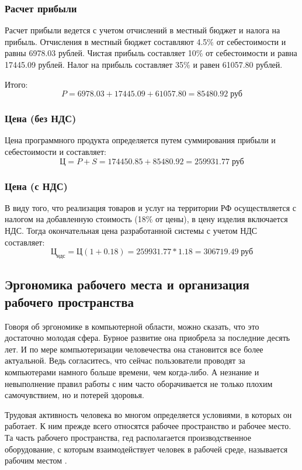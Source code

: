 \documentclass[russian,utf8,emptystyle]{eskdtext}
\begin{document}
\begin{spacing}{1.5}
\subsubsection{Расчет прибыли}
Расчет прибыли ведется с учетом отчислений в местный бюджет и налога на прибыль. Отчисления в местный бюджет составляют 4.5\% от себестоимости и равны 6978.03 рублей. Чистая прибыль составляет 10\% от себестоимости и равна 17445.09 рублей. Налог на прибыль составляет 35\% и равен 61057.80 рублей.

Итого:
$$
P = 6978.03 + 17445.09 + 61057.80 = 85480.92 \; \text{руб}
$$

\subsubsection{Цена (без НДС)}
Цена программного продукта определяется путем суммирования прибыли и себестоимости и составляет: 
$$
\text{Ц} = P + S = 174450.85 + 85480.92 = 259931.77  \; \text{руб}
$$

\subsubsection{Цена (с НДС)}
В виду того, что реализация товаров и услуг на территории РФ осуществляется с налогом на добавленную стоимость (18\% от цены), в цену изделия включается НДС. Тогда окончательная цена разработанной системы с учетом НДС составляет:
$$
\text{Ц}_\text{ндс} = \text{Ц}(1 + 0.18) = 259931.77*1.18 = 306719.49 \; \text{руб}
$$

\subsection{Эргономика рабочего места и организация рабочего пространства}
Говоря об эргономике в компьютерной области, можно сказать, что это достаточно молодая сфера. Бурное развитие она приобрела за последние десять лет. И по мере компьютеризации человечества она становится все более актуальной. Ведь согласитесь, что сейчас пользователи проводят за компьютерами намного больше времени, чем когда-либо. А незнание и невыполнение правил работы с ним часто оборачивается не только плохим самочувствием, но и потерей здоровья. 

Трудовая активность человека во многом определяется условиями, в которых он работает. К ним прежде всего относятся рабочее пространство и рабочее место. Та часть рабочего пространства, гед располагается производственное оборудование, с которым взаимодействует человек в рабочей среде, называется рабочим местом \cite{Ergonomic}.


\end{spacing}
\end{document}
